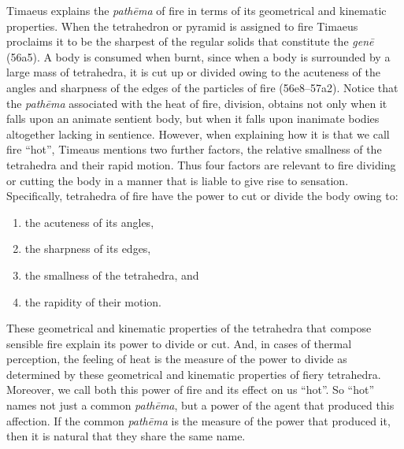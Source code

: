 Timaeus explains the \emph{pathēma} of fire in terms of its geometrical and kinematic properties. When the tetrahedron or pyramid is assigned to fire Timaeus proclaims it to be the sharpest of the regular solids that constitute the \emph{genē} (56a5). A body is consumed when burnt, since when a body is surrounded by a large mass of tetrahedra, it is cut up or divided owing to the acuteness of the angles and sharpness of the edges of the particles of fire (56e8--57a2). Notice that the \emph{pathēma} associated with the heat of fire, division, obtains not only when it falls upon an animate sentient body, but when it falls upon inanimate bodies altogether lacking in sentience. However, when explaining how it is that we call fire ``hot'', Timeaus mentions two further factors, the relative smallness of the tetrahedra and their rapid motion. Thus four factors are relevant to fire dividing or cutting the body in a manner that is liable to give rise to sensation. Specifically, tetrahedra of fire have the power to cut or divide the body owing to:
\begin{enumerate}[(1)]
	\item the acuteness of its angles,
	\item the sharpness of its edges,
	\item the smallness of the tetrahedra, and
	\item the rapidity of their motion.
\end{enumerate}
These geometrical and kinematic properties of the tetrahedra that compose sensible fire explain its power to divide or cut. And, in cases of thermal perception, the feeling of heat is the measure of the power to divide as determined by these geometrical and kinematic properties of fiery tetrahedra. Moreover, we call both this power of fire and its effect on us ``hot''. So ``hot'' names not just a common \emph{pathēma}, but a power of the agent that produced this affection. If the common \emph{pathēma} is the measure of the power that produced it, then it is natural that they share the same name.


